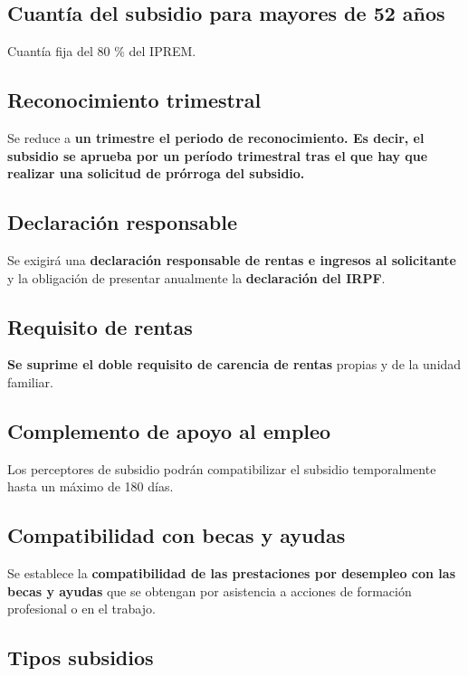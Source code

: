\documentclass{article}
\begin{document}
	\subsection*{Cuantía del subsidio para mayores de 52 años}
	
	Cuantía fija del 80 \% del IPREM.
	
	\subsection*{Reconocimiento trimestral}
	
	Se reduce a \textbf{un trimestre el periodo de reconocimiento. Es decir, el subsidio se aprueba por un período trimestral tras el que hay que realizar una solicitud de prórroga del subsidio.}
	
	\subsection*{Declaración responsable}
	
	Se exigirá una \textbf{declaración responsable de rentas e ingresos al solicitante} y la obligación de presentar anualmente la \textbf{declaración del IRPF}.
	
	\subsection*{Requisito de rentas}
	
	\textbf{Se suprime el doble requisito de carencia de rentas} propias y de la unidad familiar.
	
	\subsection*{Complemento de apoyo al empleo}
	
	Los perceptores de subsidio podrán compatibilizar el subsidio temporalmente hasta un máximo de 180 días.
	
	\subsection*{Compatibilidad con becas y ayudas}
	
	Se establece la \textbf{compatibilidad de las prestaciones por desempleo con las becas y ayudas} que se obtengan por asistencia a acciones de formación profesional o en el trabajo.
	
	\subsection*{Tipos subsidios}
	
\end{document}
